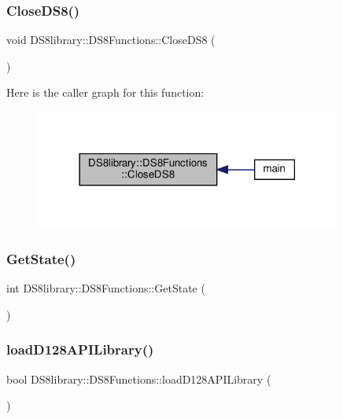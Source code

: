 \subsubsection{\texorpdfstring{Close\+D\+S8()}{CloseDS8()}}
{\footnotesize\ttfamily void D\+S8library\+::\+D\+S8\+Functions\+::\+Close\+D\+S8 (\begin{DoxyParamCaption}{ }\end{DoxyParamCaption})}

Here is the caller graph for this function\+:
\nopagebreak
\begin{figure}[H]
\begin{center}
\leavevmode
\includegraphics[width=285pt]{class_d_s8library_1_1_d_s8_functions_ae078feb572a174e1bddf5c5a44ed94fd_icgraph}
\end{center}
\end{figure}
\mbox{\label{class_d_s8library_1_1_d_s8_functions_a2cd8259f9add8a4cd7f26942baef047a}} 
\subsubsection{\texorpdfstring{Get\+State()}{GetState()}}
{\footnotesize\ttfamily int D\+S8library\+::\+D\+S8\+Functions\+::\+Get\+State (\begin{DoxyParamCaption}{ }\end{DoxyParamCaption})}

\mbox{\label{class_d_s8library_1_1_d_s8_functions_a018cdb5debaacff72ff3344c620821dd}} 
\subsubsection{\texorpdfstring{load\+D128\+A\+P\+I\+Library()}{loadD128APILibrary()}}
{\footnotesize\ttfamily bool D\+S8library\+::\+D\+S8\+Functions\+::load\+D128\+A\+P\+I\+Library (\begin{DoxyParamCaption}{ }\end{DoxyParamCaption})}


